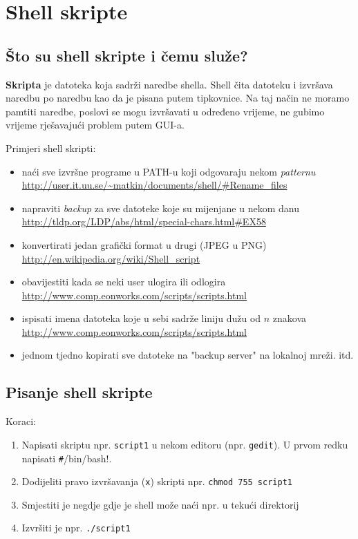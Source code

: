 \section*{Shell skripte}

\subsection*{Što su shell skripte i čemu služe?}
\textbf{Skripta} je datoteka koja sadrži naredbe shella. Shell čita datoteku i izvršava naredbu po naredbu kao da je pisana putem tipkovnice. Na taj način ne moramo pamtiti naredbe, poslovi se mogu izvršavati u određeno vrijeme, ne gubimo vrijeme rješavajući problem putem GUI-a.

\begin{primjer} Primjeri shell skripti: 
\begin{itemize}
\item  naći sve izvršne programe u PATH-u koji odgovaraju nekom \textit{patternu} \url{http://user.it.uu.se/~matkin/documents/shell/#Rename_files}
\item  napraviti \textit{backup} za sve datoteke koje su mijenjane u nekom danu \url{http://tldp.org/LDP/abs/html/special-chars.html#EX58}
\item  konvertirati jedan grafički format u drugi (JPEG u PNG) \url{http://en.wikipedia.org/wiki/Shell_script}
\item  obavijestiti kada se neki user ulogira ili odlogira \url{http://www.comp.eonworks.com/scripts/scripts.html}
\item ispisati imena datoteka koje u sebi sadrže liniju dužu od $n$ znakova \url{http://www.comp.eonworks.com/scripts/scripts.html}
\item jednom tjedno kopirati sve datoteke na "backup server" na lokalnoj mreži.
itd.
\end{itemize}
\end{primjer}

\subsection*{Pisanje shell skripte}
Koraci:
\begin{enumerate}
 \item Napisati skriptu npr. \texttt{script1} u nekom editoru (npr. \texttt{gedit}). U prvom redku napisati \lstinline!#!/bin/bash!.
\item Dodijeliti pravo izvršavanja (\texttt{x}) skripti npr. \lstinline!chmod 755 script1!
\item Smjestiti je negdje gdje je shell može naći npr. u tekući direktorij 
\item Izvršiti je npr. \texttt{./script1}
\end{enumerate}

